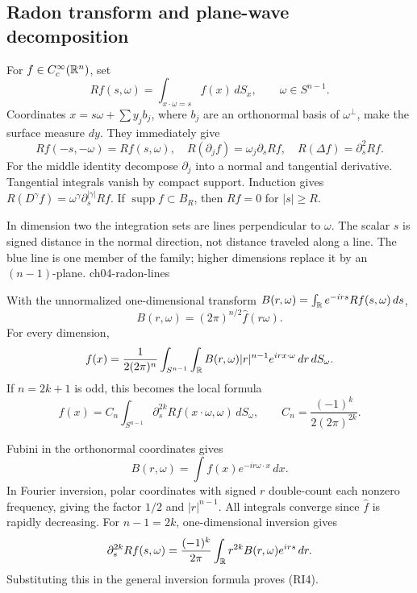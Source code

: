 \Needspace{35mm}
\subsection{Radon transform and plane-wave decomposition}\label{sec:4-radon}
For $f\in C_c^\infty(\mathbb{R}^n)$, set
\[
 Rf(s,\omega)=\int_{x\cdot\omega=s}f(x)\,dS_x,\qquad \omega\in S^{n-1}.
\]
Coordinates $x=s\omega+\sum y_jb_j$, where $b_j$ are an orthonormal
basis of $\omega^\perp$, make the surface measure $dy$.
They immediately give
\[
 Rf(-s,-\omega)=Rf(s,\omega),\quad
 R(\partial_jf)=\omega_j\partial_sRf,\quad R(\Delta f)=\partial_s^2Rf .
\]
For the middle identity decompose $\partial_j$ into a normal and
tangential derivative. Tangential integrals vanish by compact support.
Induction gives $R(D^\gamma f)=\omega^\gamma\partial_s^{|\gamma|}Rf$.
If $\operatorname{supp}f\subset B_R$, then $Rf=0$ for $|s|\geq R$.


{In dimension two the integration sets are lines perpendicular to $\omega$. The scalar $s$ is signed distance in the normal direction, not distance traveled along a line. The blue line is one member of the family; higher dimensions replace it by an $(n-1)$-plane.}
{ch04-radon-lines}

\begin{theorem}
With the unnormalized one-dimensional transform
$B(r,\omega)=\int_{\mathbb{R}} e^{-irs}Rf(s,\omega)\,ds$,
\[
 B(r,\omega)=(2\pi)^{n/2}\widehat f(r\omega).
\]
For every dimension,
\[
 f(x)=\frac1{2(2\pi)^n}
 \int_{S^{n-1}}\int_{\mathbb{R}} B(r,\omega)|r|^{n-1}e^{irx\cdot\omega}\,dr\,dS_\omega .
\]
If $n=2k+1$ is odd, this becomes the local formula
\[
 f(x)=C_n\int_{S^{n-1}}
       \partial_s^{2k}Rf(x\cdot\omega,\omega)\,dS_\omega,\qquad
 C_n=\frac{(-1)^k}{2(2\pi)^{2k}} .
 \tag{RI4}
\]
\end{theorem}
\begin{expandedproof}
Fubini in the orthonormal coordinates gives
\[
 B(r,\omega)=\int f(x)e^{-ir\omega\cdot x}\,dx .
\]
In Fourier inversion, polar coordinates with signed $r$ double-count
each nonzero frequency, giving the factor $1/2$ and $|r|^{n-1}$.
All integrals converge since $\widehat f$ is rapidly decreasing.
For $n-1=2k$, one-dimensional inversion gives
\[
 \partial_s^{2k}Rf(s,\omega)
 =\frac{(-1)^k}{2\pi}\int_{\mathbb{R}} r^{2k}B(r,\omega)e^{irs}\,dr .
\]
Substituting this in the general inversion formula proves (RI4).
\end{expandedproof}
\Needspace{45mm}


